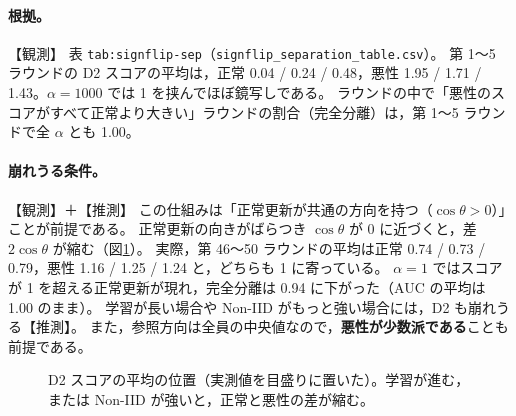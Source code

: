 \documentclass[a4j, dvipdfmx]{jsarticle}  %
\begin{document}
\paragraph{根拠。}【観測】
表 \texttt{tab:signflip-sep}（\texttt{signflip\_separation\_table.csv}）。
第 1〜5 ラウンドの D2 スコアの平均は，正常 0.04 / 0.24 / 0.48，悪性 1.95 / 1.71 / 1.43。$\alpha = 1000$ では 1 を挟んでほぼ鏡写しである。
ラウンドの中で「悪性のスコアがすべて正常より大きい」ラウンドの割合（完全分離）は，第 1〜5 ラウンドで全 $\alpha$ とも 1.00。

\paragraph{崩れうる条件。}【観測】＋【推測】
この仕組みは「正常更新が共通の方向を持つ（$\cos\theta > 0$）」ことが前提である。
正常更新の向きがばらつき $\cos\theta$ が 0 に近づくと，差 $2\cos\theta$ が縮む（図\ref{fig:sf-d2-shrink}）。
実際，第 46〜50 ラウンドの平均は正常 0.74 / 0.73 / 0.79，悪性 1.16 / 1.25 / 1.24 と，どちらも 1 に寄っている。
$\alpha = 1$ ではスコアが 1 を超える正常更新が現れ，完全分離は 0.94 に下がった（AUC の平均は 1.00 のまま）。
学習が長い場合や Non-IID がもっと強い場合には，D2 も崩れうる【推測】。
また，参照方向は全員の中央値なので，\textbf{悪性が少数派である}ことも前提である。

\begin{figure}[H]
\centering
{}
\caption{D2 スコアの平均の位置（実測値を目盛りに置いた）。学習が進む，または Non-IID が強いと，正常と悪性の差が縮む。}
\label{fig:sf-d2-shrink}
\end{figure}
\end{document}
